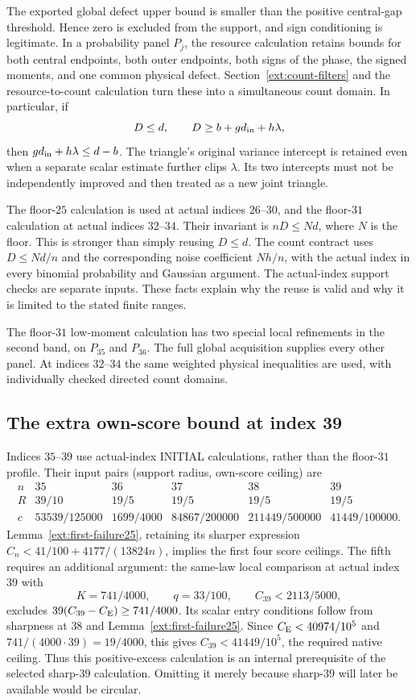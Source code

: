 The exported global defect upper bound is smaller than the positive
central-gap threshold. Hence zero is excluded from the support, and
sign conditioning is legitimate. In a probability panel $P_j$, the
resource calculation retains bounds for both central endpoints,
both outer endpoints, both signs of the phase, the signed moments,
and one common physical defect. Section~\ref{ext:count-filters} and
the resource-to-count calculation turn these into a simultaneous
count domain. In particular, if
\[
 D\le d,\qquad D\ge b+g d_{\rm in}+h\lambda,
\]
then $g d_{\rm in}+h\lambda\le d-b$. The triangle's original
variance intercept is retained even when a separate scalar estimate
further clips $\lambda$. Its two intercepts must not be independently
improved and then treated as a new joint triangle.

The floor-$25$ calculation is used at actual indices $26$--$30$,
and the floor-$31$ calculation at actual indices $32$--$34$.
Their invariant is $nD\le Nd$, where $N$ is the floor. This is stronger
than simply reusing $D\le d$. The count contract uses $D\le Nd/n$
and the corresponding noise coefficient $Nh/n$, with the actual
index in every binomial probability and Gaussian argument. The
actual-index support checks are separate inputs. These facts explain
why the reuse is valid and why it is limited to the stated finite
ranges.

The floor-$31$ low-moment calculation has two special local refinements
in the second band, on $P_{35}$ and $P_{36}$. The full global
acquisition supplies every other panel. At indices $32$--$34$ the
same weighted physical inequalities are used, with individually
checked directed count domains.

\subsection{The extra own-score bound at index 39}
Indices $35$--$39$ use actual-index INITIAL calculations, rather than
the floor-$31$ profile. Their input pairs (support radius, own-score
ceiling) are
\[
\begin{array}{c|ccccc}
 n&35&36&37&38&39\\\hline
 R&39/10&19/5&19/5&19/5&19/5\\
 c&53539/125000&1699/4000&84867/200000&211449/500000&41449/100000.
\end{array}
\]
Lemma~\ref{ext:first-failure25}, retaining its sharper expression
$C_n<41/100+4177/(13824n)$, implies the first four score ceilings.
The fifth requires an additional argument: the same-law local
comparison at actual index $39$ with
\[
 K=741/4000,\qquad q=33/100,\qquad C_{39}<2113/5000,
\]
excludes $39(C_{39}-C_{\mathrm E})\ge741/4000$. Its scalar entry conditions
follow from sharpness at $38$ and Lemma~\ref{ext:first-failure25}.
Since $C_{\mathrm E}<40974/10^5$ and $741/(4000\cdot39)=19/4000$,
this gives $C_{39}<41449/10^5$, the required native ceiling.
Thus this positive-excess calculation is an internal prerequisite of
the selected sharp-$39$ calculation. Omitting it merely because
sharp-$39$ will later be available would be circular.

